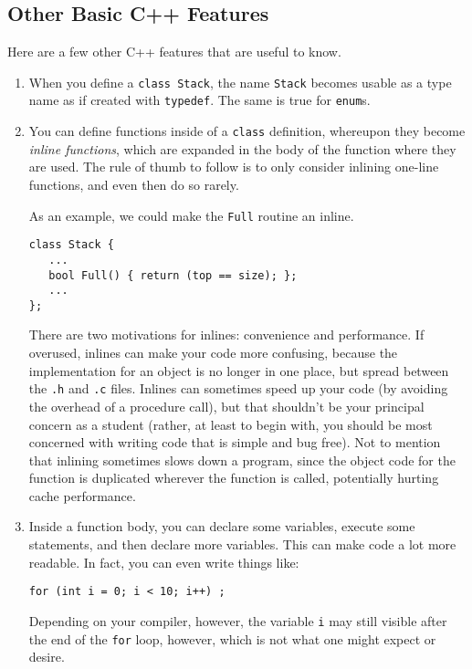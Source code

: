 \subsection{Other Basic C++ Features}

Here are a few other C++ features that are useful to know.

\begin{enumerate}

\item When you define a {\tt class Stack}, the name {\tt Stack} becomes
usable as a type name as if created with {\tt typedef}.  The same is
true for {\tt enum}s.

\item You can define functions inside of a {\tt class} definition,
whereupon they become {\it inline functions}, which are expanded in
the body of the function where they are used.  The rule of thumb to
follow is to only consider inlining one-line functions, and even then
do so rarely.

As an example, we could make the {\tt Full} routine an inline.

\begin{verbatim}
class Stack {
   ...
   bool Full() { return (top == size); };
   ...
};
\end{verbatim}

There are two motivations for inlines: convenience
and performance.  If overused, inlines can make your code more confusing,
because the implementation for an object is no longer in one place,
but spread between the {\tt .h} and {\tt .c} files.  Inlines can sometimes
speed up your code (by avoiding the overhead of a procedure call), but
that shouldn't be your principal concern as a student (rather, at least to
begin with, you should be most concerned with writing code that is simple
and bug free).  Not to mention that inlining sometimes slows down a program,
since the object code for the function is duplicated wherever the function
is called, potentially hurting cache performance.

\item Inside a function body, you can declare some variables, execute
some statements, and then declare more variables.  This can make code
a lot more readable.  In fact, you can even write things like:

\begin{verbatim}
for (int i = 0; i < 10; i++) ;
\end{verbatim}

Depending on your compiler, however, the variable {\tt i} may still visible
after the end of the {\tt for}
loop, however, which is not what one might expect or desire.


\end{enumerate}
